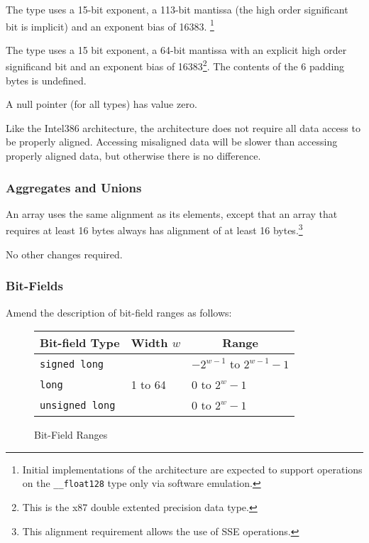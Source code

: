 The  type uses a 15-bit
exponent, a 113-bit mantissa (the high order significant bit is
implicit) and an exponent bias of 16383.%
\footnote{Initial implementations of the \xARCH architecture are
  expected to support operations on the \texttt{__float128} type only
  via software emulation.}

The  type uses a 15 bit exponent, a 64-bit mantissa
with an explicit high order significand bit and an exponent bias of
16383\footnote{This is the x87 double extented precision data type.}.
The contents of the 6 padding bytes is undefined.

A null pointer (for all types) has value zero.

Like the Intel386 architecture, the \xARCH architecture does not
require all data access to be properly aligned.  Accessing misaligned
data will be slower than accessing properly aligned data, but
otherwise there is no difference.

\subsubsection{Aggregates and Unions}

An array uses the same alignment as its elements, except that an array
that requires at least 16 bytes always has alignment of at least 16
bytes.\footnote{This alignment requirement allows the use of SSE
  operations.}

No other changes required.

\subsubsection{Bit-Fields}

Amend the description of bit-field ranges as follows:

\begin{figure}[h]
\Hrule
  \caption{Bit-Field Ranges}
  \begin{center}
    \leavevmode
    \begin{tabular}{l|l|l}
      \multicolumn{1}{c}{Bit-field Type} 
         & \multicolumn{1}{c}{Width $w$} 
         & \multicolumn{1}{c}{Range} \\
      \hline
      \texttt{signed long} & & $-2^{w - 1}$ to $2^{w-1}-1$ \\
      \texttt{long} & 1 to 64 & 0 to $2^{w}-1$ \\
      \texttt{unsigned long} & & 0 to $2^{w}-1$ \\
    \end{tabular}
  \end{center}
\Hrule
\end{figure}

